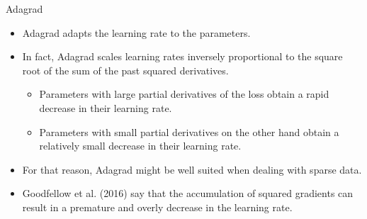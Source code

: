 \begin{vbframe}{Adagrad}
  \begin{itemize}
    \item Adagrad adapts the learning rate to the parameters.
    \item In fact, Adagrad scales learning rates inversely proportional to the square root of the sum of the past squared derivatives.
      \begin{itemize}
        \item Parameters with large partial derivatives of the loss obtain a rapid decrease in their learning rate.
        \item Parameters with small partial derivatives on the other hand obtain a relatively small decrease in their learning rate.
      \end{itemize}
    \item For that reason, Adagrad might be well suited when dealing with sparse data. 
    \item Goodfellow et al. (2016) say that the accumulation of squared gradients can result in a premature and overly decrease in the learning rate.
  \end{itemize}
  
\framebreak
  

\end{vbframe}

